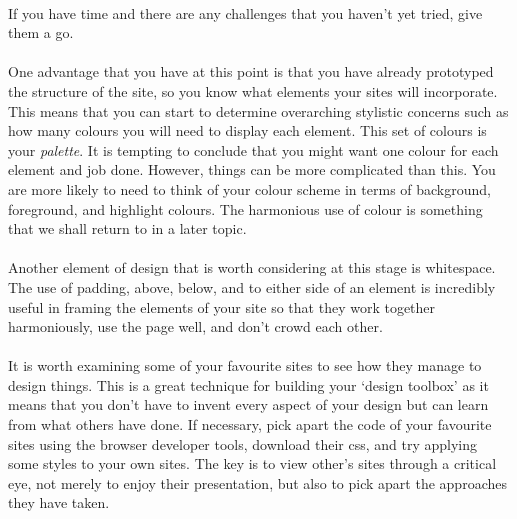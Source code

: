 \documentclass[10pt, a4paper, twosize]{article}
\begin{document}
\paragraph{} If you have time and there are any challenges that you haven't yet tried, give them a go.

\paragraph{} One advantage that you have at this point is that you have already prototyped the structure of the site, so you know what elements your sites will incorporate. This means that you can start to determine overarching stylistic concerns such as how many colours you will need to display each element. This set of colours is your \emph{palette}. It is tempting to conclude that you might want one colour for each element and job done. However, things can be more complicated than this. You are more likely to need to think of your colour scheme in terms of background, foreground, and highlight colours. The harmonious use of colour is something that we shall return to in a later topic. 

\paragraph{} Another element of design that is worth considering at this stage is whitespace. The use of padding, above, below, and to either side of an element is incredibly useful in framing the elements of your site so that they work together harmoniously, use the page well, and don't crowd each other.

\paragraph{} It is worth examining some of your favourite sites to see how they manage to design things. This is a great technique for building your `design toolbox' as it means that you don't have to invent every aspect of your design but can learn from what others have done. If necessary, pick apart the code of your favourite sites using the browser developer tools, download their css, and try applying some styles to your own sites. The key is to view other's sites through a critical eye, not merely to enjoy their presentation, but also to pick apart the approaches they have taken. 
\end{document}
